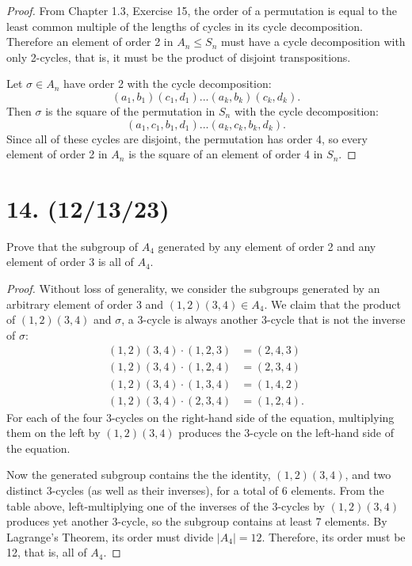 \documentclass{article}
\begin{document}
\begin{proof}
    From Chapter 1.3, Exercise 15, the order of a permutation is equal to the least common multiple of the lengths of cycles in its cycle decomposition. Therefore an element of order 2 in $A_n \leq S_n$ must have a cycle decomposition with only 2-cycles, that is, it must be the product of disjoint transpositions.

    Let $\sigma \in A_n$ have order 2 with the cycle decomposition:
    \begin{equation*}
        (a_1, b_1)(c_1, d_1)...(a_k, b_k)(c_k, d_k).
    \end{equation*}
    Then $\sigma$ is the square of the permutation in $S_n$ with the cycle decomposition:
    \begin{equation*}
        (a_1, c_1, b_1, d_1)...(a_k, c_k, b_k, d_k).
    \end{equation*}
    Since all of these cycles are disjoint, the permutation has order 4, so every element of order 2 in $A_n$ is the square of an element of order 4 in $S_n$.
\end{proof}

\section*{14. (12/13/23)}

Prove that the subgroup of $A_4$ generated by any element of order 2 and any element of order 3 is all of $A_4$.

\begin{proof}
    Without loss of generality, we consider the subgroups generated by an arbitrary element of order 3 and $(1, 2)(3, 4) \in A_4$. We claim that the product of $(1, 2)(3, 4)$ and $\sigma$, a 3-cycle is always another 3-cycle that is not the inverse of $\sigma$:
    \begin{align*}
        (1, 2)(3, 4) \cdot (1, 2, 3) &= (2, 4, 3) \\
        (1, 2)(3, 4) \cdot (1, 2, 4) &= (2, 3, 4) \\
        (1, 2)(3, 4) \cdot (1, 3, 4) &= (1, 4, 2) \\
        (1, 2)(3, 4) \cdot (2, 3, 4) &= (1, 2, 4).
    \end{align*}
    For each of the four 3-cycles on the right-hand side of the equation, multiplying them on the left by $(1, 2)(3, 4)$ produces the 3-cycle on the left-hand side of the equation.

    Now the generated subgroup contains the the identity, $(1, 2)(3, 4)$, and two distinct 3-cycles (as well as their inverses), for a total of 6 elements. From the table above, left-multiplying one of the inverses of the 3-cycles by $(1, 2)(3, 4)$ produces yet another 3-cycle, so the subgroup contains at least 7 elements. By Lagrange's Theorem, its order must divide $|A_4| = 12$. Therefore, its order must be 12, that is, all of $A_4$.
\end{proof}
\end{document}
